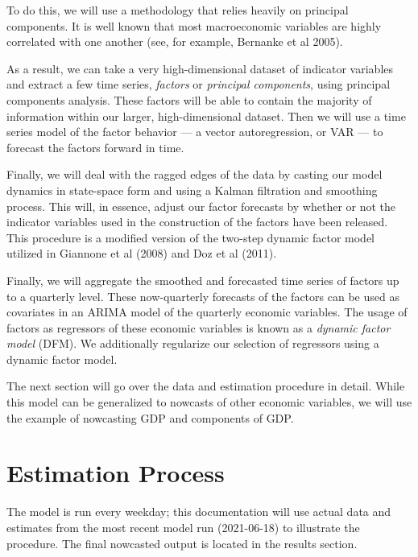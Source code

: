 \documentclass[11pt, letterpaper]{article}\usepackage[]{graphicx}\usepackage[]{color}
\makeatletter
\newenvironment{kframe}{%
 \def\at@end@of@kframe{}%
 \ifinner\ifhmode%
  \def\at@end@of@kframe{\end{minipage}}%
  \begin{minipage}{\columnwidth}%
 \fi\fi%
 \def\FrameCommand##1{\hskip\@totalleftmargin \hskip-\fboxsep
 \colorbox{shadecolor}{##1}\hskip-\fboxsep
     \hskip-\linewidth \hskip-\@totalleftmargin \hskip\columnwidth}%
 \MakeFramed {\advance\hsize-\width
   \@totalleftmargin\z@ \linewidth\hsize
   \@setminipage}}%
 {\par\unskip\endMakeFramed%
 \at@end@of@kframe}
\makeatother
\begin{document}
To do this, we will use a methodology that relies heavily on principal components. It is well known that most macroeconomic variables are highly correlated with one another (see, for example, Bernanke et al 2005).
\begin{kframe}


{\ttfamily\noindent\bfseries\color{errorcolor}{\#\# Error in loadNamespace(x): there is no package called 'corrr'}}\end{kframe}
As a result, we can take a very high-dimensional dataset of indicator variables and extract a few time series, \textit{factors} or \textit{principal components}, using principal components analysis. These factors will be able to contain the majority of information within our larger, high-dimensional dataset. Then we will use a time series model of the factor behavior --- a vector autoregression, or VAR --- to forecast the factors forward in time. 

Finally, we will deal with the ragged edges of the data by casting our model dynamics in state-space form and using a Kalman filtration and smoothing process. This will, in essence, adjust our factor forecasts by whether or not the indicator variables used in the construction of the factors have been released. This procedure is a modified version of the two-step dynamic factor model utilized in Giannone et al (2008) and Doz et al (2011).

Finally, we will aggregate the smoothed and forecasted time series of factors up to a quarterly level. These now-quarterly forecasts of the factors can be used as covariates in an ARIMA model of the quarterly economic variables. The usage of factors as regressors of these economic variables is known as a \textit{dynamic factor model} (DFM). We additionally regularize our selection of regressors using a dynamic factor model.

The next section will go over the data and estimation procedure in detail. While this model can be generalized to nowcasts of other economic variables, we will use the example of nowcasting GDP and components of GDP.

\newpage
\section{Estimation Process}
The model is run every weekday; this documentation will use actual data and estimates from the most recent model run (2021-06-18) to illustrate the procedure. The final nowcasted output is located in the results section.
\end{document}
